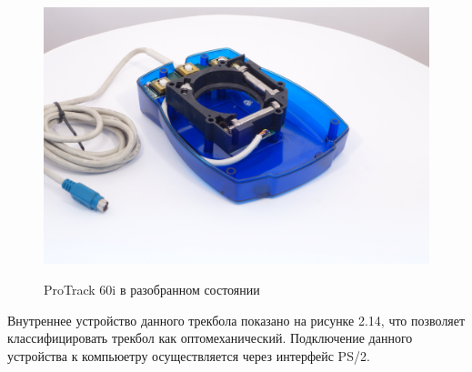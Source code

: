 \documentclass[11pt, a4paper]{article}
\begin{document}
    \begin{figure}[h]
        \centering
        \includegraphics[scale=0.4]{19xx_protrack_60i/razobr3.jpg} 
        \label{Wacom-2}
        \caption{ProTrack 60i в разобранном состоянии}
    \end{figure}

 Внутреннее устройство данного трекбола показано на рисунке 2.14, что позволяет классифицировать трекбол как оптомеханический. Подключение данного устройства к компьюетру осуществляется через интерфейс PS/2.
 
\end{document}
